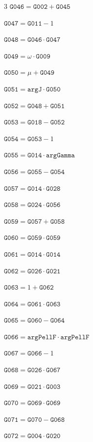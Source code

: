 \documentclass[10pt]{article}
\begin{document}
\begin{multicols}{3}
\noindent $\mathtt{G046}=\mathtt{G002}+\mathtt{G045}$\par
\noindent $\mathtt{G047}=\mathtt{G011}-1$\par
\noindent $\mathtt{G048}=\mathtt{G046}\cdot \mathtt{G047}$\par
\noindent $\mathtt{G049}=\omega\cdot \mathtt{G009}$\par
\noindent $\mathtt{G050}=\mu+\mathtt{G049}$\par
\noindent $\mathtt{G051}=\mathtt{argJ}\cdot \mathtt{G050}$\par
\noindent $\mathtt{G052}=\mathtt{G048}+\mathtt{G051}$\par
\noindent $\mathtt{G053}=\mathtt{G018}-\mathtt{G052}$\par
\noindent $\mathtt{G054}=\mathtt{G053}-1$\par
\noindent $\mathtt{G055}=\mathtt{G014}\cdot \mathtt{argGamma}$\par
\noindent $\mathtt{G056}=\mathtt{G055}-\mathtt{G054}$\par
\noindent $\mathtt{G057}=\mathtt{G014}\cdot \mathtt{G028}$\par
\noindent $\mathtt{G058}=\mathtt{G024}\cdot \mathtt{G056}$\par
\noindent $\mathtt{G059}=\mathtt{G057}+\mathtt{G058}$\par
\noindent $\mathtt{G060}=\mathtt{G059}\cdot \mathtt{G059}$\par
\noindent $\mathtt{G061}=\mathtt{G014}\cdot \mathtt{G014}$\par
\noindent $\mathtt{G062}=\mathtt{G026}\cdot \mathtt{G021}$\par
\noindent $\mathtt{G063}=1+\mathtt{G062}$\par
\noindent $\mathtt{G064}=\mathtt{G061}\cdot \mathtt{G063}$\par
\noindent $\mathtt{G065}=\mathtt{G060}-\mathtt{G064}$\par
\noindent $\mathtt{G066}=\mathtt{argPellF}\cdot \mathtt{argPellF}$\par
\noindent $\mathtt{G067}=\mathtt{G066}-1$\par
\noindent $\mathtt{G068}=\mathtt{G026}\cdot \mathtt{G067}$\par
\noindent $\mathtt{G069}=\mathtt{G021}\cdot \mathtt{G003}$\par
\noindent $\mathtt{G070}=\mathtt{G069}\cdot \mathtt{G069}$\par
\noindent $\mathtt{G071}=\mathtt{G070}-\mathtt{G068}$\par
\noindent $\mathtt{G072}=\mathtt{G004}\cdot \mathtt{G020}$\par

\end{multicols}
\end{document}
